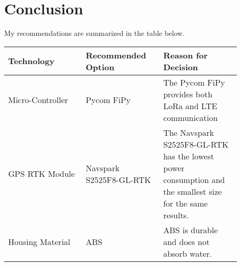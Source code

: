 \documentclass[onecolumn, draftclsnofoot,10pt, compsoc]{IEEEtran}
\begin{document}
\section{Conclusion}
    My recommendations are summarized in the table below.
\begin{table}[h]
\centering
\begin{tabular}{|p{0.3\linewidth}|p{0.3\linewidth}|p{0.3\linewidth}|}
    \hline
    Technology & Recommended Option & Reason for Decision \\
    \hline
    Micro-Controller & Pycom FiPy & The Pycom FiPy provides both LoRa and LTE communication \\
    \hline
    GPS RTK Module & Navspark S2525F8-GL-RTK & The Navspark S2525F8-GL-RTK has the lowest power consumption and the smallest size for the same results. \\
    \hline
    Housing Material & ABS & ABS is durable and does not absorb water.  \\
    \hline
\end{tabular}
\end{table}


\end{document}
